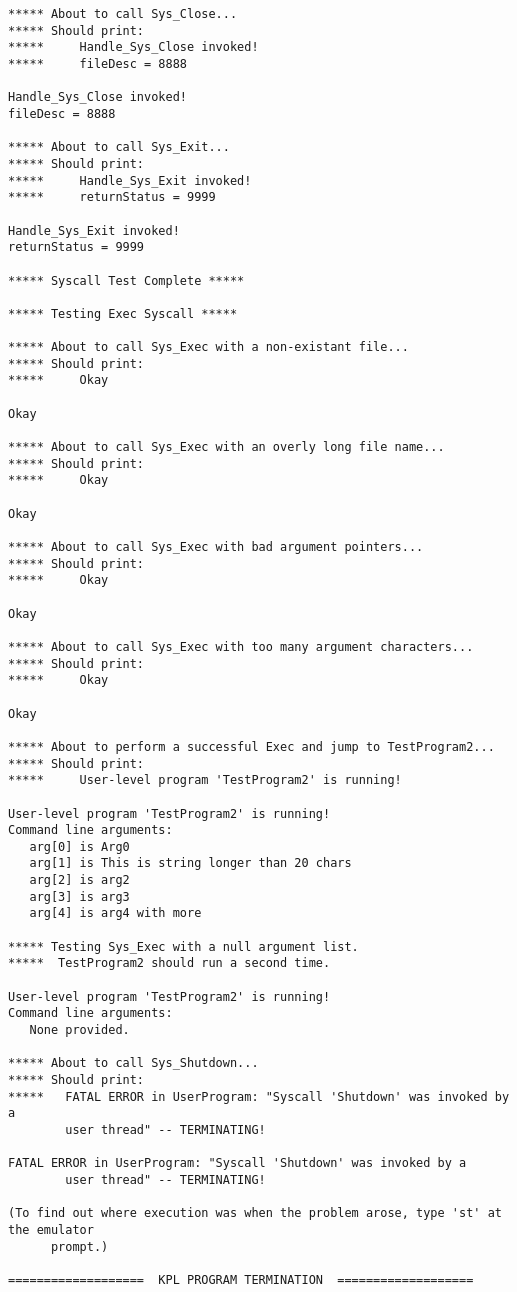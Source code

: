 \documentclass[12pt]{article}
\begin{document}
{\begin{verbatim}
***** About to call Sys_Close...
***** Should print:
*****     Handle_Sys_Close invoked!
*****     fileDesc = 8888

Handle_Sys_Close invoked!
fileDesc = 8888

***** About to call Sys_Exit...
***** Should print:
*****     Handle_Sys_Exit invoked!
*****     returnStatus = 9999

Handle_Sys_Exit invoked!
returnStatus = 9999

***** Syscall Test Complete *****

***** Testing Exec Syscall *****

***** About to call Sys_Exec with a non-existant file...
***** Should print:
*****     Okay

Okay

***** About to call Sys_Exec with an overly long file name...
***** Should print:
*****     Okay

Okay

***** About to call Sys_Exec with bad argument pointers...
***** Should print:
*****     Okay

Okay

***** About to call Sys_Exec with too many argument characters...
***** Should print:
*****     Okay

Okay

***** About to perform a successful Exec and jump to TestProgram2...
***** Should print:
*****     User-level program 'TestProgram2' is running!

User-level program 'TestProgram2' is running!
Command line arguments:
   arg[0] is Arg0
   arg[1] is This is string longer than 20 chars
   arg[2] is arg2
   arg[3] is arg3
   arg[4] is arg4 with more

***** Testing Sys_Exec with a null argument list.
*****  TestProgram2 should run a second time.

User-level program 'TestProgram2' is running!
Command line arguments:
   None provided.

***** About to call Sys_Shutdown...
***** Should print:
*****   FATAL ERROR in UserProgram: "Syscall 'Shutdown' was invoked by a
        user thread" -- TERMINATING!

FATAL ERROR in UserProgram: "Syscall 'Shutdown' was invoked by a 
        user thread" -- TERMINATING!

(To find out where execution was when the problem arose, type 'st' at the emulator 
      prompt.)

===================  KPL PROGRAM TERMINATION  ===================
\end{verbatim}
}
\end{document}

